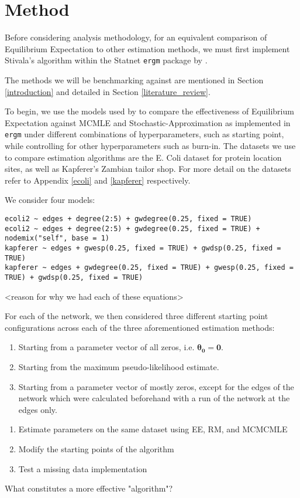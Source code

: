 \section{Method}

Before considering analysis methodology, for an equivalent comparison of Equilibrium Expectation to other estimation methods, we must first implement Stivala's algorithm within the Statnet \texttt{ergm} package by \cite{ergm}. 


The methods we will be benchmarking against are mentioned in Section \ref{introduction} and detailed in Section \ref{literature_review}.

To begin, we use the models used by \cite{hummels2012} to compare the effectiveness of Equilibrium Expectation against MCMLE and Stochastic-Approximation as implemented in \texttt{ergm} under different combinations of hyperparameters, such as starting point, while controlling for other hyperparameters such as burn-in. The datasets we use to compare estimation algorithms are the E. Coli dataset for protein location sites, as well as Kapferer's Zambian tailor shop. For more detail on the datasets refer to Appendix \ref{ecoli} and \ref{kapferer} respectively.

We consider four models:

\begin{lstlisting}
ecoli2 ~ edges + degree(2:5) + gwdegree(0.25, fixed = TRUE)
ecoli2 ~ edges + degree(2:5) + gwdegree(0.25, fixed = TRUE) + nodemix("self", base = 1)
kapferer ~ edges + gwesp(0.25, fixed = TRUE) + gwdsp(0.25, fixed = TRUE)
kapferer ~ edges + gwdegree(0.25, fixed = TRUE) + gwesp(0.25, fixed = TRUE) + gwdsp(0.25, fixed = TRUE)
\end{lstlisting}

<reason for why we had each of these equations>

For each of the network, we then considered three different starting point configurations across each of the three aforementioned estimation methods:
\begin{enumerate}
\item Starting from a parameter vector of all zeros, i.e. $\boldsymbol{\theta_0} = \boldsymbol{0}$.
\item Starting from the maximum pseudo-likelihood estimate.
\item Starting from a parameter vector of mostly zeros, except for the edges of the network which were calculated beforehand with a run of the network at the edges only.
\end{enumerate}

\begin{enumerate}
\item Estimate parameters on the same dataset using EE, RM, and MCMCMLE
\item Modify the starting points of the algorithm
\item Test a missing data implementation
\end{enumerate}

What constitutes a more effective "algorithm"?

